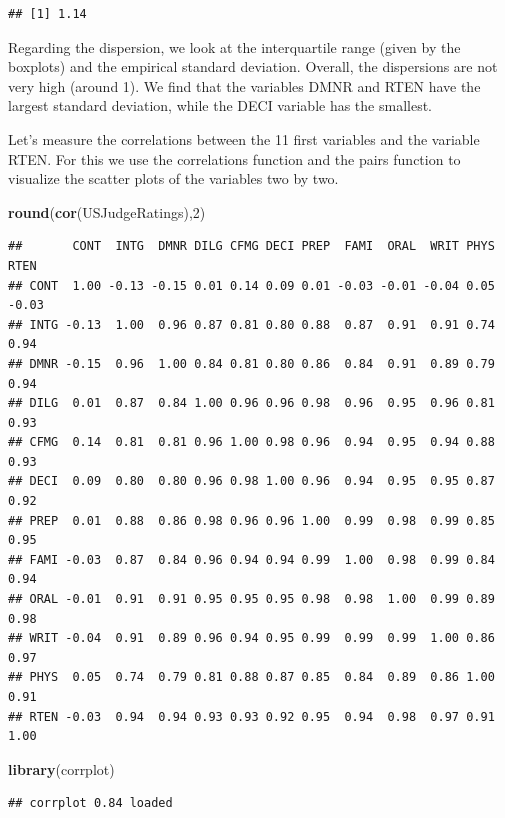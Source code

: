 \documentclass[]{article}
\newenvironment{Shaded}{\begin{snugshade}}{\end{snugshade}}
\newcommand{\DecValTok}[1]{\textcolor[rgb]{0.00,0.00,0.81}{#1}}
\newcommand{\KeywordTok}[1]{\textcolor[rgb]{0.13,0.29,0.53}{\textbf{#1}}}
\newcommand{\NormalTok}[1]{#1}
\begin{document}
\begin{verbatim}
## [1] 1.14
\end{verbatim}

Regarding the dispersion, we look at the interquartile range (given by
the boxplots) and the empirical standard deviation. Overall, the
dispersions are not very high (around 1). We find that the variables
DMNR and RTEN have the largest standard deviation, while the DECI
variable has the smallest.

Let's measure the correlations between the 11 first variables and the
variable RTEN. For this we use the correlations function and the pairs
function to visualize the scatter plots of the variables two by two.

\begin{Shaded}
\begin{Highlighting}[]
\KeywordTok{round}\NormalTok{(}\KeywordTok{cor}\NormalTok{(USJudgeRatings),}\DecValTok{2}\NormalTok{)}
\end{Highlighting}
\end{Shaded}

\begin{verbatim}
##       CONT  INTG  DMNR DILG CFMG DECI PREP  FAMI  ORAL  WRIT PHYS  RTEN
## CONT  1.00 -0.13 -0.15 0.01 0.14 0.09 0.01 -0.03 -0.01 -0.04 0.05 -0.03
## INTG -0.13  1.00  0.96 0.87 0.81 0.80 0.88  0.87  0.91  0.91 0.74  0.94
## DMNR -0.15  0.96  1.00 0.84 0.81 0.80 0.86  0.84  0.91  0.89 0.79  0.94
## DILG  0.01  0.87  0.84 1.00 0.96 0.96 0.98  0.96  0.95  0.96 0.81  0.93
## CFMG  0.14  0.81  0.81 0.96 1.00 0.98 0.96  0.94  0.95  0.94 0.88  0.93
## DECI  0.09  0.80  0.80 0.96 0.98 1.00 0.96  0.94  0.95  0.95 0.87  0.92
## PREP  0.01  0.88  0.86 0.98 0.96 0.96 1.00  0.99  0.98  0.99 0.85  0.95
## FAMI -0.03  0.87  0.84 0.96 0.94 0.94 0.99  1.00  0.98  0.99 0.84  0.94
## ORAL -0.01  0.91  0.91 0.95 0.95 0.95 0.98  0.98  1.00  0.99 0.89  0.98
## WRIT -0.04  0.91  0.89 0.96 0.94 0.95 0.99  0.99  0.99  1.00 0.86  0.97
## PHYS  0.05  0.74  0.79 0.81 0.88 0.87 0.85  0.84  0.89  0.86 1.00  0.91
## RTEN -0.03  0.94  0.94 0.93 0.93 0.92 0.95  0.94  0.98  0.97 0.91  1.00
\end{verbatim}

\begin{Shaded}
\begin{Highlighting}[]
\KeywordTok{library}\NormalTok{(corrplot)}
\end{Highlighting}
\end{Shaded}

\begin{verbatim}
## corrplot 0.84 loaded
\end{verbatim}
\end{document}
